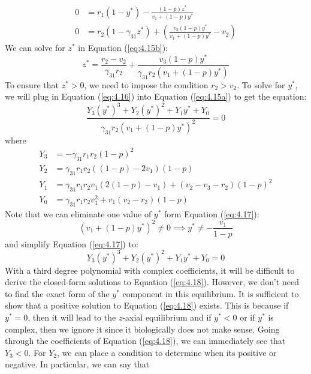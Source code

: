 \begin{subequations}
    \begin{align}
        0 &= r_1\left(1-y^*\right)-\frac{\left(1-p\right)z^*}{v_1+\left(1-p\right)y^*}
        \label{eq:4.15a}\\
        0 &= r_2\left(1-\gamma_{31}z^*\right)+\left(\frac{v_3\left(1-p\right)y^*}{v_1+\left(1-p\right)y^*}-v_2\right)
        \label{eq:4.15b}
    \end{align}
    \label{eq:4.15}
\end{subequations}
We can solve for $z^*$ in Equation (\ref{eq:4.15b}):
\begin{equation}
    z^*=\frac{r_2-v_2}{\gamma_{31}r_2}+\frac{v_3\left(1-p\right)y^*}{\gamma_{31}r_2\left(v_1+\left(1-p\right)y^*\right)}
    \label{eq:4.16}
\end{equation}
To ensure that $z^*>0$, we need to impose the condition $r_2>v_2$. To solve for $y^*$, we will plug in Equation (\ref{eq:4.16}) into Equation (\ref{eq:4.15a}) to get the equation:
\begin{equation}
    \frac{Y_3\left(y^*\right)^3+Y_2\left(y^*\right)^2+Y_1y^*+Y_0}{\gamma_{31}r_2\left(v_1+\left(1-p\right)y^*\right)^2}=0
    \label{eq:4.17}
\end{equation}
where
\begin{align*}
    Y_3 &= -\gamma_{31}r_1r_2\left(1-p\right)^2\\
    Y_2 &= \gamma_{31}r_1r_2\left(\left(1-p\right)-2v_1\right)\left(1-p\right)\\
    Y_1 &= \gamma_{31}r_1r_2v_1\left(2\left(1-p\right)-v_1\right)+\left(v_2-v_3-r_2\right)\left(1-p\right)^2\\
    Y_0 &= \gamma_{31}r_1r_2v_1^2+v_1\left(v_2-r_2\right)\left(1-p\right)
\end{align*}
Note that we can eliminate one value of $y^*$ form Equation (\ref{eq:4.17}):
\[
\left(v_1+\left(1-p\right)y^*\right)^2\neq0 \implies y^*\neq-\frac{v_1}{1-p}
\]
and simplify Equation (\ref{eq:4.17}) to:
\begin{equation}
    Y_3\left(y^*\right)^3+Y_2\left(y^*\right)^2+Y_1y^*+Y_0=0
    \label{eq:4.18}
\end{equation}
With a third degree polynomial with complex coefficients, it will be difficult to derive the closed-form solutions to Equation (\ref{eq:4.18}). However, we don't need to find the exact form of the $y^*$ component in this equilibrium. It is sufficient to show that a positive solution to Equation (\ref{eq:4.18}) exists. This is because if $y^*=0$, then it will lead to the $z$-axial equilibrium and if $y^*<0$ or if $y^*$ is complex, then we ignore it since it biologically does not make sense. Going through the coefficients of Equation (\ref{eq:4.18}), we can immediately see that $Y_3<0$. For $Y_2$, we can place a condition to determine when its positive or negative. In particular, we can say that
